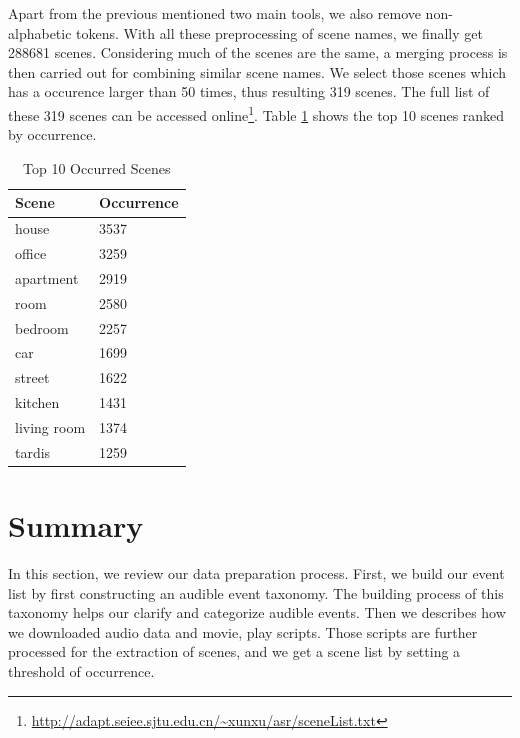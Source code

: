 Apart from the previous mentioned two main tools, we also remove non-alphabetic tokens. 
With all these preprocessing of scene names, we finally get 288681 scenes. 
Considering much of the scenes are the same, a merging process is then carried out for combining similar scene names. 
We select those scenes which has a occurence larger than 50 times, thus resulting 319 scenes.
The full list of these 319 scenes can be accessed online\footnote{\url{http://adapt.seiee.sjtu.edu.cn/~xunxu/asr/sceneList.txt}}. 
Table \ref{tab:top10scenes} shows the top 10 scenes ranked by occurrence. 
\begin{table}[htb]
\centering
\caption{Top 10 Occurred Scenes}
\begin{tabular}{ll}
\hline
Scene & Occurrence \\
\hline
house & 3537 \\ 
office & 3259 \\ 
apartment & 2919 \\ 
room & 2580 \\ 
bedroom & 2257 \\ 
car & 1699 \\ 
street & 1622 \\ 
kitchen & 1431 \\ 
living room & 1374 \\ 
tardis & 1259 \\ 
\hline
\end{tabular}
\label{tab:top10scenes}
\end{table}

\section{Summary}
In this section, we review our data preparation process. 
First, we build our event list by first constructing an audible event taxonomy. 
The building process of this taxonomy helps our clarify and categorize audible events. 
Then we describes how we downloaded audio data and movie, play scripts. 
Those scripts are further processed for the extraction of scenes, and we get a scene list by setting a threshold of occurrence. 

